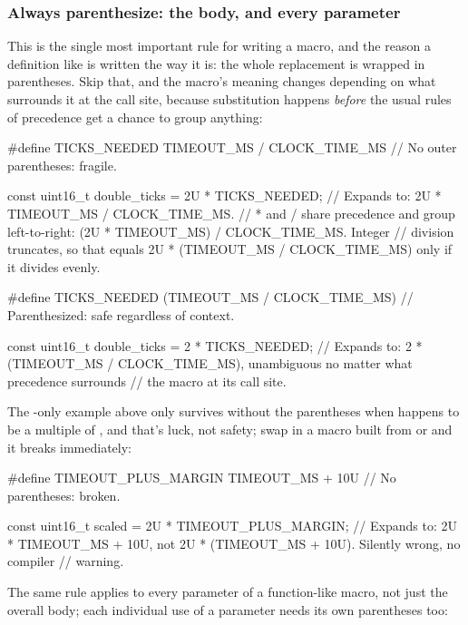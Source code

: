 \subsubsection{Always parenthesize: the body, and every parameter}
This is the single most important rule for writing a macro, and the reason a definition like
 is written the way it is: the whole
replacement is wrapped in parentheses. Skip that, and the macro's meaning changes depending on what
surrounds it at the call site, because substitution happens \emph{before} the usual rules of
precedence get a chance to group anything:

\begin{ccode}
#define TICKS_NEEDED TIMEOUT_MS / CLOCK_TIME_MS // No outer parentheses: fragile.

const uint16_t double_ticks = 2U * TICKS_NEEDED; // Expands to: 2U * TIMEOUT_MS / CLOCK_TIME_MS.
// * and / share precedence and group left-to-right: (2U * TIMEOUT_MS) / CLOCK_TIME_MS. Integer
// division truncates, so that equals 2U * (TIMEOUT_MS / CLOCK_TIME_MS) only if it divides evenly.
\end{ccode}

\begin{ccode}
#define TICKS_NEEDED (TIMEOUT_MS / CLOCK_TIME_MS) // Parenthesized: safe regardless of context.

const uint16_t double_ticks = 2 * TICKS_NEEDED;
// Expands to: 2 * (TIMEOUT_MS / CLOCK_TIME_MS), unambiguous no matter what precedence surrounds
// the macro at its call site.
\end{ccode}

\noindent The \code{/}-only example above only survives without the parentheses when
 happens to be a multiple of , and that's luck, not safety;
swap in a macro built from \code{+} or \code{-} and it breaks immediately:

\begin{ccode}
#define TIMEOUT_PLUS_MARGIN TIMEOUT_MS + 10U   // No parentheses: broken.

const uint16_t scaled = 2U * TIMEOUT_PLUS_MARGIN;
// Expands to: 2U * TIMEOUT_MS + 10U, not 2U * (TIMEOUT_MS + 10U). Silently wrong, no compiler
// warning.
\end{ccode}

\noindent The same rule applies to every parameter of a function-like macro, not just the overall
body; each individual use of a parameter needs its own parentheses too:

